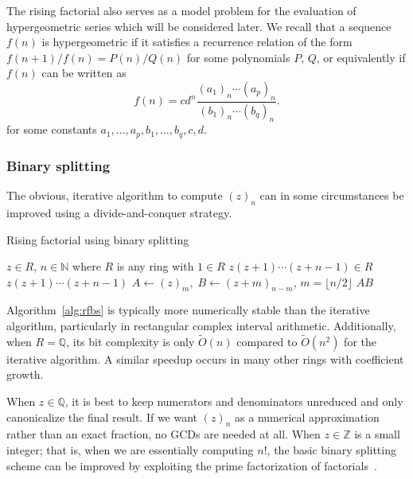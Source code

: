 \documentclass[reqno]{amsart}
\newcommand{\ZZ}{\mathbb{Z}}
\newcommand{\QQ}{\mathbb{Q}}
\newcommand{\NN}{\mathbb{N}}
\newcommand{\bigOtilde}{\widetilde O}
\theoremstyle{definition}
\begin{document}
The rising
factorial also serves as a model problem for the evaluation of hypergeometric series which will be considered later.
We recall that a sequence $f(n)$ is hypergeometric if it satisfies
a recurrence relation of the form $f(n+1) / f(n) = P(n) / Q(n)$
for some polynomials $P$, $Q$, or equivalently if $f(n)$
can be written as
\begin{equation}
f(n) = c d^n \frac{(a_1)_n \cdots (a_p)_n}{(b_1)_n \cdots (b_q)_n}.
\end{equation}
for some constants $a_1, \ldots, a_p, b_1, \ldots, b_q, c, d$.

\subsubsection{Binary splitting}

The obvious, iterative algorithm
to compute $(z)_n$ can in some circumstances
be improved using a divide-and-conquer strategy.

\begin{algorithm}%
\caption{Rising factorial using binary splitting}\label{alg:rfbs}
\small
\begin{algorithmic}[1]
\Require $z \in R$, $n \in \NN$ where $R$ is any ring with $1 \in R$
\Ensure $z (z+1) \cdots (z+n-1) \in R$
 
  \State \Return $z (z+1) \cdots (z+n-1)$ 
\EndIf
\State $A \gets (z)_m, \; B \gets (z + m)_{n - m}$, \quad $m = \lfloor n / 2 \rfloor$  
\State \Return $AB$
\end{algorithmic}
\end{algorithm}

Algorithm~\ref{alg:rfbs} is typically more numerically stable than
the iterative algorithm, particularly in rectangular complex interval
arithmetic. Additionally, when $R = \QQ$,
its bit complexity is only $\bigOtilde(n)$
compared to $\bigOtilde(n^2)$ for the iterative algorithm.
A similar speedup occurs in many other rings with coefficient growth.

When $z \in \QQ$, it is best to keep numerators and denominators
unreduced and only canonicalize the final result.
If we want $(z)_n$ as a numerical approximation
rather than an exact fraction, no GCDs are needed at all.
When $z \in \ZZ$ is a small integer; that is, when we are
essentially computing $n!$, the basic binary splitting scheme
can be improved by exploiting the prime factorization of factorials~\cite{Borwein1985,Lus2008}.
\end{document}
